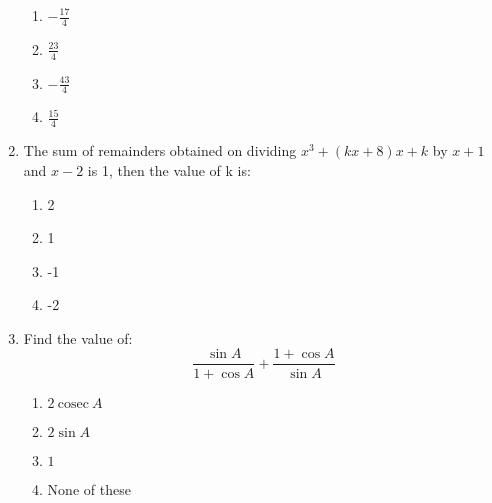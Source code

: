 \begin{enumerate}[label=(\roman*)]
        \begin{multicols}{2}
        \begin{enumerate}[label=(\alph*)]
            \item $-\frac{17}{4}$
            \item $\frac{23}{4}$
            \item $-\frac{43}{4}$
            \item $\frac{15}{4}$
        \end{enumerate}
        \end{multicols}

    \item The sum of remainders obtained on dividing $x^3 + (kx+8)x + k$ by 
          $x+1$ and $x-2$ is 1, then the value of k is:

        \begin{multicols}{2}
        \begin{enumerate}[label=(\alph*)]
            \item 2
            \item 1
            \item -1
            \item -2
        \end{enumerate}
        \end{multicols}

    \item Find the value of:
        \[ \frac{\sin A}{1 + \cos A} + \frac{1+ \cos A}{\sin A} \]

        \begin{multicols}{2}
        \begin{enumerate}[label=(\alph*)]
            \item $2 \ \mathrm{cosec} \ A$
            \item $2 \sin A$
            \item $1$
            \item None of these
        \end{enumerate}
        \end{multicols}

\end{enumerate}

